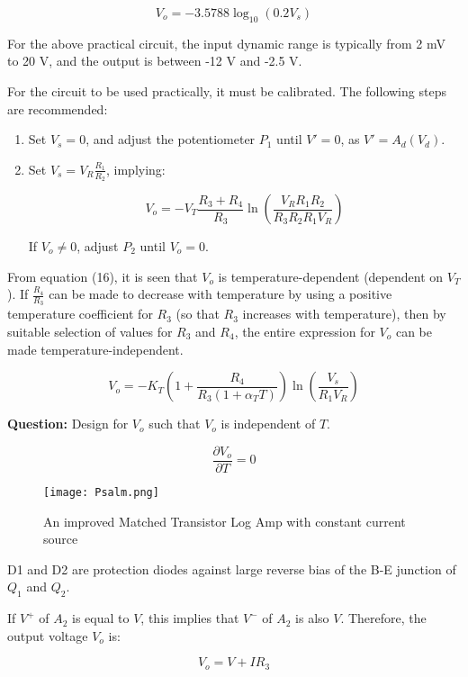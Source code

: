 \documentclass[a4paper,9pt,twoside,openany,twocolumn]{memoir}
\begin{document}
\[
V_o = -3.5788 \log_{10} \left( 0.2 V_s \right) \tag{20}
\]

For the above practical circuit, the input dynamic range is typically from 2 mV to 20 V, and the output is between -12 V and -2.5 V.

For the circuit to be used practically, it must be calibrated. The following steps are recommended:

\begin{enumerate}
    \item Set \( V_s = 0 \), and adjust the potentiometer \( P_1 \) until \( V' = 0 \), as \( V' = A_d (V_d) \).
    \item Set \( V_s = V_R \frac{R_1}{R_2} \), implying:

    \[
    V_o = -V_T \frac{R_3 + R_4}{R_3} \ln \left( \frac{V_R R_1 R_2}{R_3 R_2 R_1 V_R} \right)
    \]

    If \( V_o \neq 0 \), adjust \( P_2 \) until \( V_o = 0 \).
\end{enumerate}

From equation (16), it is seen that \( V_o \) is temperature-dependent (dependent on \( V_T \)). If \( \frac{R_4}{R_3} \) can be made to decrease with temperature by using a positive temperature coefficient for \( R_3 \) (so that \( R_3 \) increases with temperature), then by suitable selection of values for \( R_3 \) and \( R_4 \), the entire expression for \( V_o \) can be made temperature-independent.

\[
V_o = -K_T \left( 1 + \frac{R_4}{R_3 (1 + \alpha_T T)} \right) \ln \left( \frac{V_s}{R_1 V_R} \right) \tag{21}
\]

\textbf{Question:} Design for \( V_o \) such that \( V_o \) is independent of \( T \). 

\[
\frac{\partial V_o}{\partial T} = 0 \tag{22}
\]

\begin{figure}[H]
    \centering
    \texttt{[image: Psalm.png]}
    \caption{An improved Matched Transistor Log Amp with constant current source}
    \label{fig:question_image}
\end{figure}

D1 and D2 are protection diodes against large reverse bias of the B-E junction of \( Q_1 \) and \( Q_2 \). 

If \( V^+ \) of \( A_2 \) is equal to \( V \), this implies that \( V^- \) of \( A_2 \) is also \( V \). Therefore, the output voltage \( V_o \) is:

\[
V_o = V + I R_3 \tag{1}
\]
\end{document}

